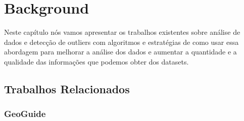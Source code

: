 \chapter{Background}


Neste capítulo nós vamos apresentar os trabalhos existentes sobre análise de dados e detecção de outliers com algoritmos e estratégias de como usar essa abordagem para melhorar a análise dos dados e aumentar a quantidade e a qualidade das informações que podemos obter dos datasets.

\section{Trabalhos Relacionados}

\subsection{GeoGuide}


